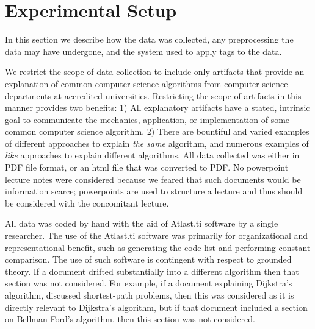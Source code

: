 \documentclass[sigconf]{acmart}
\begin{document}

\section{Experimental Setup}
\label{sec:exp:data}
In this section we describe how the data was collected, any preprocessing the
data may have undergone, and the system used to apply tags to the data. 

We restrict the scope of data collection to include only artifacts that provide
an explanation of common computer science algorithms from computer science
departments at accredited universities. Restricting the scope of artifacts in
this manner provides two benefits: 1) All explanatory artifacts have a stated,
intrinsic goal to communicate the mechanics, application, or implementation of
some common computer science algorithm. 2) There are bountiful and varied
examples of different approaches to explain \emph{the same} algorithm, and
numerous examples of \emph{like} approaches to explain different algorithms. All
data collected was either in PDF file format, or an html file that was converted
to PDF. No powerpoint lecture notes were considered because we feared that such
documents would be information scarce; powerpoints are used to structure a
lecture and thus should be considered with the concomitant lecture.

All data was coded by hand with the aid of Atlast.ti software  by a single researcher. The use of the Atlast.ti software
was primarily for organizational and representational benefit, such as
generating the code list and performing constant comparison.
%
The use of such software is contingent with respect to grounded theory.
%
If a document drifted substantially into a different algorithm then that section
was not considered. For example, if a document explaining Dijkstra's algorithm,
discussed shortest-path problems, then this was considered as it is directly
relevant to Dijkstra's algorithm, but if that document included a section on
Bellman-Ford's algorithm, then this section was not considered.
\end{document}
